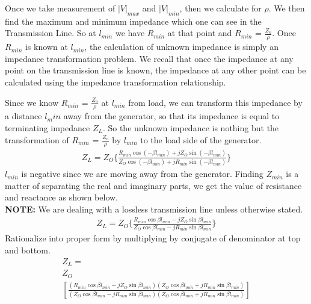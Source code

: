 Once we take measurement of $|V|_{max}$ and $|V|_{min}$, then we calculate for $ \rho $. We then find the maximum and minimum impedance which one can see in the Transmission Line. So at $l_{min}$ we have $R_{min}$ at that point and $R_{min}$ = $\frac{Z_{o}}{\rho}$. Once $R_{min}$ is known at $l_{min}$, the calculation of unknown impedance is simply an impedance transformation problem. We recall that once the impedance at any point on the transmission line is known, the impedance at any other point can be calculated using the impedance transformation relationship.

Since we know $R_{min}$ = $\frac{Z_{o}}{\rho}$ at $l_{min}$ from load, we can transform this impedance by a distance $l_min$ away from the generator, so that its impedance is equal to terminating impedance $Z_{L}$. So the unknown impedance is nothing but the transformation of $R_{min}$ = $\frac{Z_{o}}{\rho}$ by $l_{min}$ to the load side of the generator. 
\begin{align}
Z_{L} = Z_{O}\{\frac{R_{min}\cos(-\beta l_{min}) + jZ_{O}\sin(-\beta l_{min})}{Z_{O}\cos(-\beta l_{min}) + jR_{min}\sin(-\beta l_{min})}\}
\end{align}
$l_{min}$ is negative since we are moving away from the generator. Finding $Z_{min}$ is a matter of separating the real and imaginary parts, we get the value of resistance and reactance as shown below.\\
\textbf{NOTE:} We are dealing with a lossless transmission line unless otherwise stated.\newline
\begin{align}
Z_{L} = Z_{O}\{\frac{R_{min}\cos\beta l_{min} - jZ_{O}\sin\beta l_{min}}{Z_{O}\cos\beta l_{min} - jR_{min}\sin\beta l_{min}}\}
\end{align}
Rationalize into proper form by multiplying by conjugate of denominator at top and bottom.
{\footnotesize 
\begin{align}
Z_{L} =\\ Z_{O}\\ 
\left[\frac{(R_{min}\cos\beta l_{min} - jZ_{O}\sin\beta l_{min})(Z_{O}\cos\beta l_{min} + jR_{min}\sin\beta l_{min})}{(Z_{O}\cos\beta l_{min} - jR_{min}\sin\beta l_{min})(Z_{O}\cos\beta l_{min} + jR_{min}\sin\beta l_{min})}\right]
\end{align}} 

